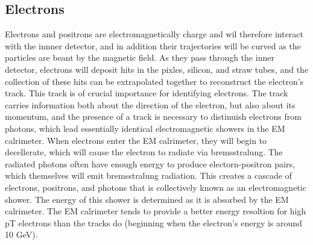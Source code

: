 


\subsection{Electrons}
Electrons and positrons are electromagnetically charge and wil therefore interact with the innner detector, and in addition their trajectories will be curved as the particles are beant by the magnetic field.
As they pass through the inner detector, electrons will deposit hits in the pixles, silicon, and straw tubes, and the collection of these hits can be extrapolated together to reconstruct the electron's track.
This track is of crucial importance for identifying electrons.
The track carries information both about the direction of the electron, but also about its momentum, and the presence of a track is necessary to distinuish electrons from photons, which lead essentially identical electromagnetic showers in the EM calrimeter.
When electrons enter the EM calrimeter, they will begin to decellerate, which will cause the electron to radiate via bremsstralung.
The radiated photons often have enough energy to produce electorn-positron pairs, which themselves will emit bremsstralung radiation.
This creates a cascade of electrons, positrons, and photons that is collectively known as an electromagnetic shower.
The energy of this shower is determined as it is absorbed by the EM calrimeter.
The EM calrimeter tends to provide a better energy resoltion for high pT electrons than the tracks do (beginning when the electron's energy is around 10 GeV).

